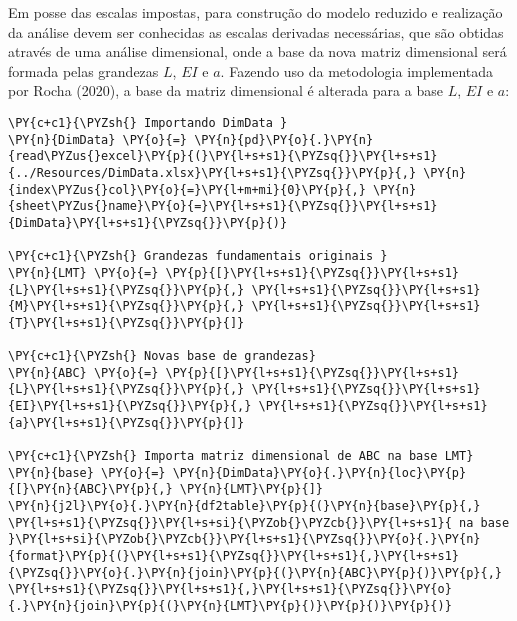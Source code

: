     Em posse das escalas impostas, para construção do modelo reduzido e
realização da análise devem ser conhecidas as escalas derivadas
necessárias, que são obtidas através de uma análise dimensional, onde a
base da nova matriz dimensional será formada pelas grandezas \(L\),
\(EI\) e \(a\). Fazendo uso da metodologia implementada por Rocha
(2020), a base da matriz dimensional é alterada para a base \(L\),
\(EI\) e \(a\):

    \begin{tcolorbox}[breakable, size=fbox, boxrule=1pt, pad at break*=1mm,colback=cellbackground, colframe=cellborder]
\begin{Verbatim}[commandchars=\\\{\}]
\PY{c+c1}{\PYZsh{} Importando DimData }
\PY{n}{DimData} \PY{o}{=} \PY{n}{pd}\PY{o}{.}\PY{n}{read\PYZus{}excel}\PY{p}{(}\PY{l+s+s1}{\PYZsq{}}\PY{l+s+s1}{../Resources/DimData.xlsx}\PY{l+s+s1}{\PYZsq{}}\PY{p}{,} \PY{n}{index\PYZus{}col}\PY{o}{=}\PY{l+m+mi}{0}\PY{p}{,} \PY{n}{sheet\PYZus{}name}\PY{o}{=}\PY{l+s+s1}{\PYZsq{}}\PY{l+s+s1}{DimData}\PY{l+s+s1}{\PYZsq{}}\PY{p}{)}

\PY{c+c1}{\PYZsh{} Grandezas fundamentais originais }
\PY{n}{LMT} \PY{o}{=} \PY{p}{[}\PY{l+s+s1}{\PYZsq{}}\PY{l+s+s1}{L}\PY{l+s+s1}{\PYZsq{}}\PY{p}{,} \PY{l+s+s1}{\PYZsq{}}\PY{l+s+s1}{M}\PY{l+s+s1}{\PYZsq{}}\PY{p}{,} \PY{l+s+s1}{\PYZsq{}}\PY{l+s+s1}{T}\PY{l+s+s1}{\PYZsq{}}\PY{p}{]}

\PY{c+c1}{\PYZsh{} Novas base de grandezas}
\PY{n}{ABC} \PY{o}{=} \PY{p}{[}\PY{l+s+s1}{\PYZsq{}}\PY{l+s+s1}{L}\PY{l+s+s1}{\PYZsq{}}\PY{p}{,} \PY{l+s+s1}{\PYZsq{}}\PY{l+s+s1}{EI}\PY{l+s+s1}{\PYZsq{}}\PY{p}{,} \PY{l+s+s1}{\PYZsq{}}\PY{l+s+s1}{a}\PY{l+s+s1}{\PYZsq{}}\PY{p}{]} 

\PY{c+c1}{\PYZsh{} Importa matriz dimensional de ABC na base LMT}
\PY{n}{base} \PY{o}{=} \PY{n}{DimData}\PY{o}{.}\PY{n}{loc}\PY{p}{[}\PY{n}{ABC}\PY{p}{,} \PY{n}{LMT}\PY{p}{]}
\PY{n}{j2l}\PY{o}{.}\PY{n}{df2table}\PY{p}{(}\PY{n}{base}\PY{p}{,} \PY{l+s+s1}{\PYZsq{}}\PY{l+s+si}{\PYZob{}\PYZcb{}}\PY{l+s+s1}{ na base }\PY{l+s+si}{\PYZob{}\PYZcb{}}\PY{l+s+s1}{\PYZsq{}}\PY{o}{.}\PY{n}{format}\PY{p}{(}\PY{l+s+s1}{\PYZsq{}}\PY{l+s+s1}{,}\PY{l+s+s1}{\PYZsq{}}\PY{o}{.}\PY{n}{join}\PY{p}{(}\PY{n}{ABC}\PY{p}{)}\PY{p}{,} \PY{l+s+s1}{\PYZsq{}}\PY{l+s+s1}{,}\PY{l+s+s1}{\PYZsq{}}\PY{o}{.}\PY{n}{join}\PY{p}{(}\PY{n}{LMT}\PY{p}{)}\PY{p}{)}\PY{p}{)}


\end{Verbatim}
\end{tcolorbox}
